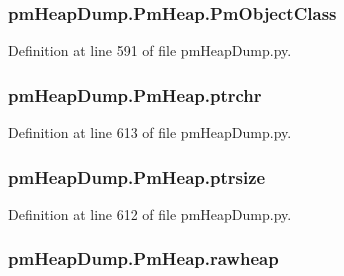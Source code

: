 \hypertarget{classpm_heap_dump_1_1_pm_heap_a71cd0fd44f1be1820e74cb09163298e2}{
\subsubsection[{Pm\-Object\-Class}]{\setlength{\rightskip}{0pt plus 5cm}pm\-Heap\-Dump.\-Pm\-Heap.\-Pm\-Object\-Class}}\label{classpm_heap_dump_1_1_pm_heap_a71cd0fd44f1be1820e74cb09163298e2}


Definition at line 591 of file pm\-Heap\-Dump.\-py.

\hypertarget{classpm_heap_dump_1_1_pm_heap_a6f91a8f9776b91d20ff64f724dedd0b4}{
\subsubsection[{ptrchr}]{\setlength{\rightskip}{0pt plus 5cm}pm\-Heap\-Dump.\-Pm\-Heap.\-ptrchr}}\label{classpm_heap_dump_1_1_pm_heap_a6f91a8f9776b91d20ff64f724dedd0b4}


Definition at line 613 of file pm\-Heap\-Dump.\-py.

\hypertarget{classpm_heap_dump_1_1_pm_heap_a4f9192405255b247b62a121118d6f72b}{
\subsubsection[{ptrsize}]{\setlength{\rightskip}{0pt plus 5cm}pm\-Heap\-Dump.\-Pm\-Heap.\-ptrsize}}\label{classpm_heap_dump_1_1_pm_heap_a4f9192405255b247b62a121118d6f72b}


Definition at line 612 of file pm\-Heap\-Dump.\-py.

\hypertarget{classpm_heap_dump_1_1_pm_heap_ad7b4a7d026b4c9c11361105a3390a932}{
\subsubsection[{rawheap}]{\setlength{\rightskip}{0pt plus 5cm}pm\-Heap\-Dump.\-Pm\-Heap.\-rawheap}}\label{classpm_heap_dump_1_1_pm_heap_ad7b4a7d026b4c9c11361105a3390a932}


